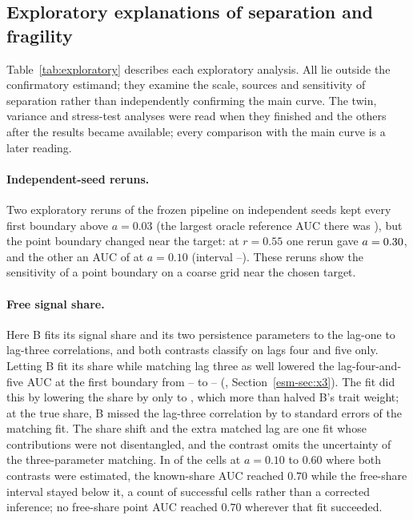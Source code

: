 \subsection{Exploratory explanations of separation and fragility}\label{sec:results-exploratory}

Table~\ref{tab:exploratory} describes each exploratory analysis. All lie outside the confirmatory estimand; they examine the scale, sources and sensitivity of separation rather than independently confirming the main curve. The twin, variance and stress-test analyses were read when they finished and the others after the results became available; every comparison with the main curve is a later reading.



\paragraph{Independent-seed reruns.} Two exploratory reruns of the frozen pipeline on independent seeds kept every first boundary above $a=0.03$ (the largest oracle reference AUC there was ), but the point boundary changed near the target: at $r=0.55$ one rerun gave $a=\resultnum{j.x7.frozen_first.r055}{0.30}$, and the other an AUC of  at $a=0.10$ (interval --). These reruns show the sensitivity of a point boundary on a coarse grid near the chosen target.

\paragraph{Free signal share.} Here B fits its signal share and its two persistence parameters to the lag-one to lag-three correlations, and both contrasts classify on lags four and five only. Letting B fit its share while matching lag three as well lowered the lag-four-and-five AUC at the first boundary from -- to -- (\esmresource, Section~\ref{esm-sec:x3}). The fit did this by lowering the share by only  to , which more than halved B's trait weight; at the true share, B missed the lag-three correlation by  to  standard errors of the matching fit. The share shift and the extra matched lag are one fit whose contributions were not disentangled, and the contrast omits the uncertainty of the three-parameter matching. In  of the  cells at $a=0.10$ to $0.60$ where both contrasts were estimated, the known-share AUC reached $0.70$ while the free-share interval stayed below it, a count of successful cells rather than a corrected inference; no free-share point AUC reached $0.70$ wherever that fit succeeded.


